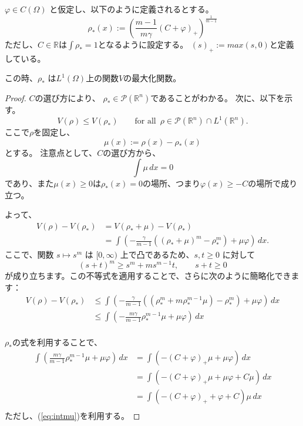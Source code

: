 \begin{lem}
    \label{lem:rho_opt}
    $\varphi \in C(\Omega)$ と仮定し、以下のように定義されるとする。
    $$
        \rho_*(x) := \left( \frac{m-1}{m\gamma}(C + \varphi)_+ \right)^{\frac{1}{m-1}} 
    $$
    ただし、$C \in \mathbb{R}$は$\int \rho_* = 1$となるように設定する。
    $(s)_+ := max(s, 0)$と定義している。

    この時、$\rho_*$ は$L^1(\Omega)$上の関数$V$の最大化関数。
\end{lem}
\begin{proof}
    $C$の選び方により、 $\rho_* \in \mathcal{P}(\mathbb{R}^n)$であることがわかる。
    次に、以下を示す。
    $$
    V(\rho) \leq V(\rho_*) \qquad \text{for all } \, \rho \in \mathcal{P}(\mathbb{R}^n) \cap L^1(\mathbb{R}^n).
    $$
    ここで$\rho$を固定し、 
    $$
    \mu(x) := \rho(x) - \rho_*(x)
    $$
    とする。
    注意点として、$C$の選び方から、
    \begin{equation}
        \label{eq:intmu}
        \int \mu \, dx = 0
    \end{equation}
    であり、また$\mu(x) \geq 0$は$\rho_*(x) = 0$の場所、つまり$\varphi(x) \geq -C$の場所で成り立つ。

    よって、
    \begin{align*}
        V(\rho) - V(\rho_*) &= V(\rho_* + \mu) - V(\rho_*)\\
                            &= \int \left(- \frac{\gamma}{m-1} ((\rho_* + \mu)^m - \rho_*^{m}) + \mu \varphi \right) \, dx.
    \end{align*}
    ここで、関数 $s \mapsto s^m$ は $[0, \infty)$ 上で凸であるため、$s, t \geq 0$ に対して 
    $$
        (s + t)^m \geq s^m + ms^{m-1}t, \qquad s + t \geq 0
    $$ 
    が成り立ちます。この不等式を適用することで、さらに次のように簡略化できます：
    \begin{align*}
        V(\rho) - V(\rho_*) &\leq \int \left(- \frac{\gamma}{m-1} ((\rho_*^m + m \rho_*^{m-1} \mu) - \rho_*^{m}) + \mu \varphi \right) \, dx\\
                            &\leq \int \left(- \frac{m\gamma}{m-1} \rho_*^{m-1}\mu + \mu\varphi\right) \, dx\\
    \end{align*}

    $\rho_*$の式を利用することで、
    \begin{align*}
        \int \left(\frac{m\gamma}{m-1} \rho_*^{m-1}\mu + \mu\varphi\right) \, dx &= \int \left(-(C + \varphi)_+ \mu + \mu\varphi\right) \, dx \\
                                                                        &= \int \left(-(C + \varphi)_+ \mu + \mu \varphi + C \mu\right) \, dx \\
                                                                        &= \int \left(-(C + \varphi)_+ + \varphi + C\right)\mu \, dx \\  
    \end{align*}
    ただし、(\ref{eq:intmu})を利用する。


\end{proof}
